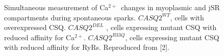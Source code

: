 \documentclass[a0]{a0poster}
\def\Ca{Ca$^{2+}$}
\begin{document}
\begin{textblock}{6}
\begin{center}
\begin{figure}
\begin{picture}
\end{picture}


\vspace{2.5in}
\caption{Simultaneous measurement of \Ca\ changes in myoplasmic and jSR compartments during spontaneous sparks. $CASQ2^{WT}$, cells with overexpressed CSQ. $CASQ2^{DEL}$ , cells expressing mutant CSQ with reduced affinity for \Ca. $CASQ2^{R33Q}$, cells expressing mutant CSQ with reduced affinity for RyRs. Reproduced from [2].}
\label{fig:models}
\end{figure}
\end{center}





\end{textblock}
\end{document}
